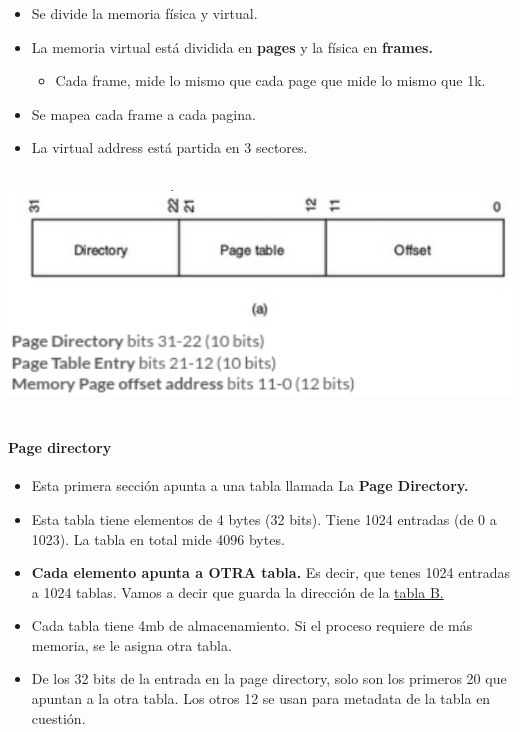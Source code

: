 \documentclass{article}
\begin{document}
\begin{itemize}
\item
  Se divide la memoria física y virtual.
\item
  La memoria virtual está dividida en \textbf{pages} y la física en
  \textbf{frames.}

  \begin{itemize}
  \item
    Cada frame, mide lo mismo que cada page que mide lo mismo que 1k.
  \end{itemize}
\item
  Se mapea cada frame a cada pagina.
\item
  La virtual address está partida en 3 sectores.
\end{itemize}


\includegraphics[width=6.20704in,height=2.52044in]{media/MemoriaPaginada.png}

\paragraph{\texorpdfstring{Page directory
}{Page directory }}\label{page-directory}

\begin{itemize}
\item
  Esta primera sección apunta a una tabla llamada La \textbf{Page
  Directory.}
\item
  Esta tabla tiene elementos de 4 bytes (32 bits). Tiene 1024 entradas
  (de 0 a 1023). La tabla en total mide 4096 bytes.
\item
  \textbf{Cada elemento apunta a OTRA tabla.} Es decir, que tenes 1024
  entradas a 1024 tablas. Vamos a decir que guarda la dirección de la
  \underline{tabla B.}
\item
  Cada tabla tiene 4mb de almacenamiento. Si el proceso requiere de más
  memoria, se le asigna otra tabla.
\item
  De los 32 bits de la entrada en la page directory, solo son los
  primeros 20 que apuntan a la otra tabla. Los otros 12 se usan para
  metadata de la tabla en cuestión.
\end{itemize}
\end{document}
